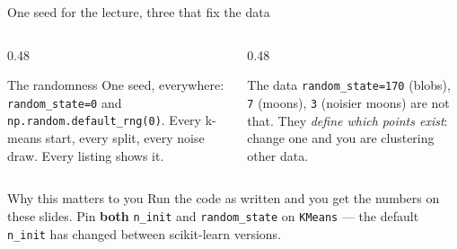 \documentclass[aspectratio=169]{beamer}
\begin{document}
\begin{frame}{One seed for the lecture, three that fix the data}
  \begin{columns}[T]
    \begin{column}{0.48\textwidth}
      \begin{block}{The randomness}
        \small One seed, everywhere: \texttt{random\_state=0} and
        \texttt{np.random.default\_rng(0)}. Every k-means start, every
        split, every noise draw. Every listing shows it.
      \end{block}
    \end{column}
    \begin{column}{0.48\textwidth}
      \begin{block}{The data}
        \small \texttt{random\_state=170} (blobs), \texttt{7} (moons),
        \texttt{3} (noisier moons) are not that. They \emph{define which
        points exist}: change one and you are clustering other data.
      \end{block}
    \end{column}
  \end{columns}
  \vspace{0.5em}
  \begin{exampleblock}{Why this matters to you}
    \centering\small
    Run the code as written and you get the numbers on these slides. Pin
    \textbf{both} \texttt{n\_init} and \texttt{random\_state} on
    \texttt{KMeans} --- the default \texttt{n\_init} has changed between
    scikit-learn versions.
  \end{exampleblock}
\end{frame}
\end{document}

